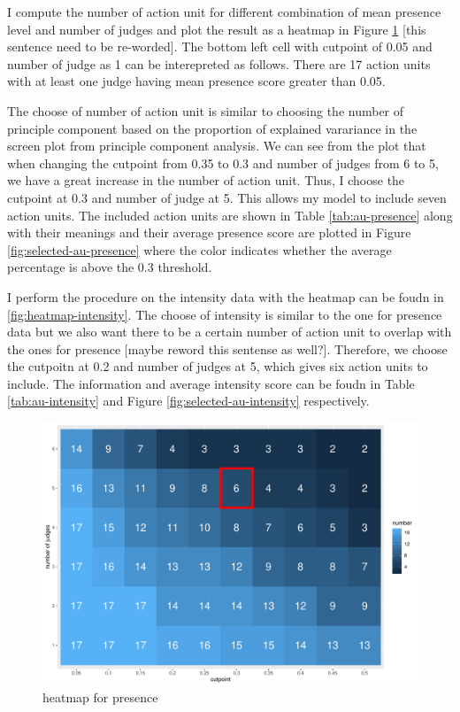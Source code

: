 \documentclass{monashthesis}
\begin{document}
I compute the number of action unit for different combination of mean presence level and number of judges and plot the result as a heatmap in Figure \ref{fig:heatmap-presence} {[}this sentence need to be re-worded{]}. The bottom left cell with cutpoint of 0.05 and number of judge as 1 can be interepreted as follows. There are 17 action units with at least one judge having mean presence score greater than 0.05.

The choose of number of action unit is similar to choosing the number of principle component based on the proportion of explained varariance in the screen plot from principle component analysis. We can see from the plot that when changing the cutpoint from 0.35 to 0.3 and number of judges from 6 to 5, we have a great increase in the number of action unit. Thus, I choose the cutpoint at 0.3 and number of judge at 5. This allows my model to include seven action units. The included action units are shown in Table \ref{tab:au-presence} along with their meanings and their average presence score are plotted in Figure \ref{fig:selected-au-presence} where the color indicates whether the average percentage is above the 0.3 threshold.

I perform the procedure on the intensity data with the heatmap can be foudn in \ref{fig:heatmap-intensity}. The choose of intensity is similar to the one for presence data but we also want there to be a certain number of action unit to overlap with the ones for presence {[}maybe reword this sentense as well?{]}. Therefore, we choose the cutpoitn at 0.2 and number of judges at 5, which gives six action units to include. The information and average intensity score can be foudn in Table \ref{tab:au-intensity} and Figure \ref{fig:selected-au-intensity} respectively.

\begin{figure}

{\centering \includegraphics[width=1\linewidth]{figures/heatmap-presence-1} 

}

\caption{heatmap for presence}\label{fig:heatmap-presence}
\end{figure}
\end{document}
